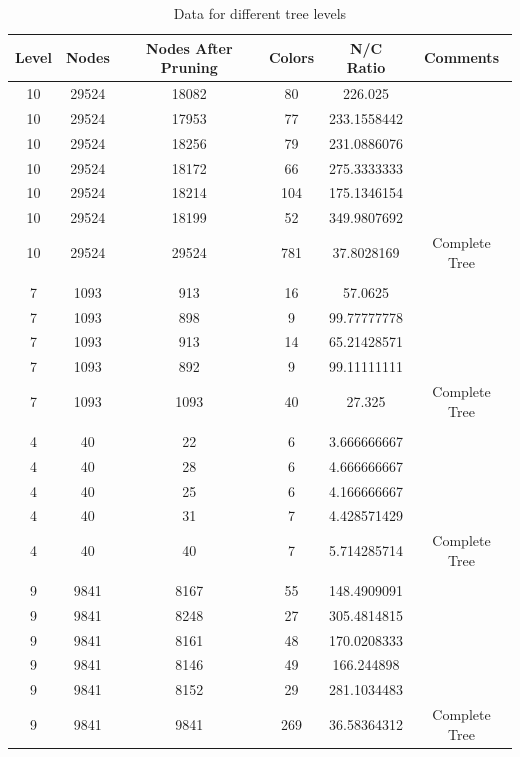 \documentclass{article}
\theoremstyle{remark}
\begin{document}
\begin{table}[h]
    \centering
    \begin{tabular}{|c|c|c|c|c|c|}
        \hline
        \textbf{Level} & \textbf{Nodes} & \textbf{Nodes After Pruning} & \textbf{Colors} & \textbf{N/C Ratio} & \textbf{Comments} \\ \hline
        10 & 29524 & 18082 & 80 & 226.025 &  \\ \hline
        10 & 29524 & 17953 & 77 & 233.1558442 & \\ \hline
        10 & 29524 & 18256 & 79 & 231.0886076 & \\ \hline
        10 & 29524 & 18172 & 66 & 275.3333333 & \\ \hline
        10 & 29524 & 18214 & 104 & 175.1346154 & \\ \hline
        10 & 29524 & 18199 & 52 & 349.9807692 & \\ \hline
        10 & 29524 & 29524 & 781 & 37.8028169 & Complete Tree \\ \hline
        & & & & & \\ \hline
        7 & 1093 & 913 & 16 & 57.0625 &  \\ \hline
        7 & 1093 & 898 & 9 & 99.77777778 & \\ \hline
        7 & 1093 & 913 & 14 & 65.21428571 & \\ \hline
        7 & 1093 & 892 & 9 & 99.11111111 & \\ \hline
        7 & 1093 & 1093 & 40 & 27.325 & Complete Tree \\ \hline
        & & & & & \\ \hline
        4 & 40 & 22 & 6 & 3.666666667 &  \\ \hline
        4 & 40 & 28 & 6 & 4.666666667 & \\ \hline
        4 & 40 & 25 & 6 & 4.166666667 & \\ \hline
        4 & 40 & 31 & 7 & 4.428571429 & \\ \hline
        4 & 40 & 40 & 7 & 5.714285714 & Complete Tree \\ \hline
        & & & & & \\ \hline
        9 & 9841 & 8167 & 55 & 148.4909091 & \\ \hline
        9 & 9841 & 8248 & 27 & 305.4814815 & \\ \hline
        9 & 9841 & 8161 & 48 & 170.0208333 & \\ \hline
        9 & 9841 & 8146 & 49 & 166.244898 & \\ \hline
        9 & 9841 & 8152 & 29 & 281.1034483 & \\ \hline
        9 & 9841 & 9841 & 269 & 36.58364312 & Complete Tree \\ \hline
    \end{tabular}
    \caption{Data for different tree levels}
    \label{tab:data}
\end{table}
\end{document}
